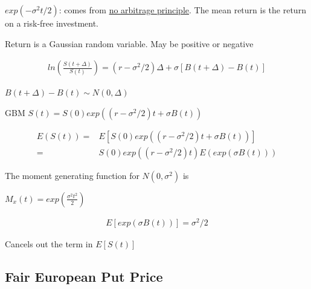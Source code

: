 \documentclass[11pt]{article}
\begin{document}
\(exp(-\sigma^2 t/2)\): comes from \uline{no arbitrage principle}. The mean return is
the return on a risk-free investment.

Return is a Gaussian random variable. May be positive or negative

\begin{equation}
  \begin{split}
    ln(\frac{S(t + \Delta)}{S(t)}) = (r - \sigma^2/2) \Delta + \sigma[B(t + \Delta) - B(t)]
  \end{split}
\end{equation}

\(B(t + \Delta) - B(t) \sim N(0, \Delta)\)

GBM
\(S(t) = S(0) exp((r - \sigma^2/2)t + \sigma B(t))\)

\begin{equation}
  \begin{split}
    E(S(t)) = & E[S(0) exp((r - \sigma^2/2)t + \sigma B(t))]\\
= & S(0) exp((r - \sigma^2/2)t) E(exp(\sigma B(t)))
  \end{split}
\end{equation}

The moment generating function for \(N(0, \sigma^2)\) is

\(M_x(t) = exp(\frac{\sigma^2 t^2}{2})\)

\begin{equation}
  \begin{split}
    E[exp(\sigma B(t))] = \sigma^2/2
  \end{split}
\end{equation}

Cancels out the term in \(E[S(t)]\)

\subsection{Fair European Put Price}
\label{sec:orgb4a235f}
\end{document}
